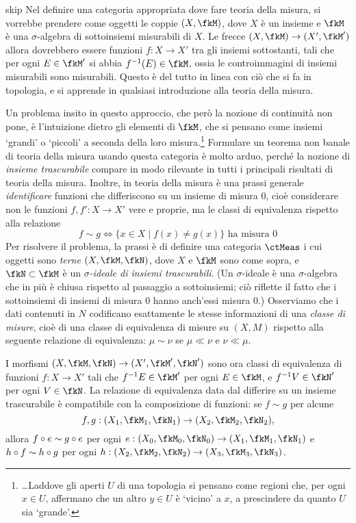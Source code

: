 \begin{hExample}{skip}\label{ex_cat_meas}
	Nel definire una categoria appropriata dove fare teoria della misura, si vorrebbe prendere come oggetti le coppie \((X, \fkM)\), dove \(X\) è un insieme e \(\fkM\) è una \(\sigma\)-algebra di sottoinsiemi misurabili di \(X\). Le frecce \((X, \fkM) \to (X', \fkM')\) allora dovrebbero essere funzioni \(f: X \to X'\) tra gli insiemi sottostanti, tali che per ogni \(E \in \fkM'\) si abbia \(f^{-1}(E) \in \fkM\), ossia le controimmagini di insiemi misurabili sono misurabili. Questo è del tutto in linea con ciò che si fa in topologia, e si apprende in qualsiasi introduzione alla teoria della misura.

	Un problema insito in questo approccio, che però la nozione di continuità non pone, è l'intuizione dietro gli elementi di \(\fkM\), che si pensano come insiemi `grandi' o `piccoli' a seconda della loro misura.\footnote{\dots Laddove gli aperti \(U\) di una topologia si pensano come regioni che, per ogni \(x\in U\), affermano che un altro \(y\in U\) è `vicino' a \(x\), a prescindere da quanto \(U\) sia `grande'.} Formulare un teorema non banale di teoria della misura usando questa categoria è molto arduo, perché la nozione di \emph{insieme trascurabile} compare in modo rilevante in tutti i principali risultati di teoria della misura. Inoltre, in teoria della misura è una prassi generale \emph{identificare} funzioni che differiscono su un insieme di misura \(0\), cioè considerare non le funzioni \(f,f' : X\to X'\) vere e proprie, ma le classi di equivalenza rispetto alla relazione
	\[f\sim g \iff \{x\in X\mid f(x)\ne g(x)\} \text{ ha misura } 0\]
	Per risolvere il problema, la prassi è di definire una categoria \(\ctMeas\) i cui oggetti sono \emph{terne} \((X, \fkM, \fkN)\), dove \(X\) e \(\fkM\) sono come sopra, e \(\fkN \subset \fkM\) è un \emph{\(\sigma\)-ideale di insiemi trascurabili}. (Un \(\sigma\)-ideale è una \(\sigma\)-algebra che in più è chiusa rispetto al passaggio a sottoinsiemi; ciò riflette il fatto che i sottoinsiemi di insiemi di misura \(0\) hanno anch'essi misura \(0\).) Osserviamo che i dati contenuti in \(N\) codificano esattamente le stesse informazioni di una \emph{classe di misure}, cioè di una classe di equivalenza di misure su \((X, M)\) rispetto alla seguente relazione di equivalenza: \(\mu \sim \nu\) se \(\mu \ll \nu\) e \(\nu \ll \mu\).

	I morfismi \((X, \fkM, \fkN) \to (X', \fkM', \fkN')\) sono ora classi di equivalenza di funzioni \(f: X \to X'\) tali che \(f^{-1}E \in \fkM'\) per ogni \(E\in \fkM\), e \(f^{-1}V \in \fkN'\) per ogni \(V\in \fkN\). La relazione di equivalenza data dal differire su un insieme trascurabile è compatibile con la composizione di funzioni: se \(f \sim g\) per alcune
	\[
		f,g : (X_1, \fkM_1, \fkN_1) \to (X_2, \fkM_2, \fkN_2),
	\]
	allora \(f\circ e \sim g\circ e\) per ogni \(e: (X_0, \fkM_0, \fkN_0) \to (X_1, \fkM_1, \fkN_1)\) e \(h\circ f \sim h\circ g\) per ogni \(h: (X_2, \fkM_2, \fkN_2) \to (X_3, \fkM_3, \fkN_3)\).
\end{hExample}

